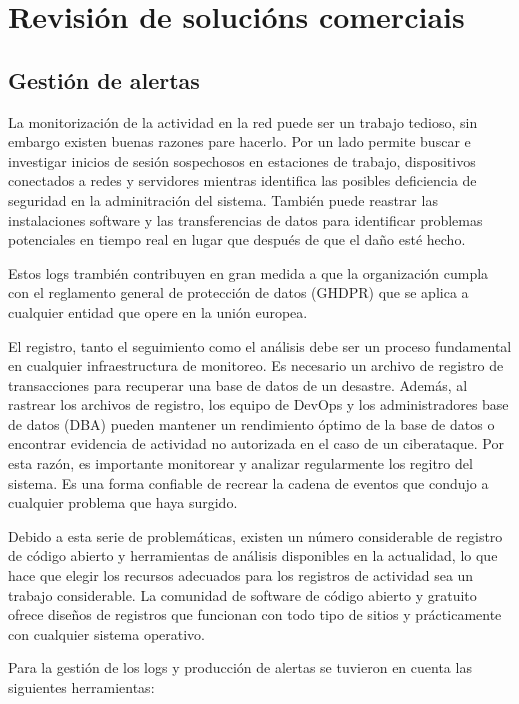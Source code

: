 \chapter{Revisión de solucións comerciais}

\section{Gestión de alertas}

La monitorización de la actividad en la red puede ser un trabajo tedioso, sin embargo existen buenas razones pare hacerlo. Por un lado permite buscar e investigar inicios de sesión sospechosos en estaciones de trabajo, dispositivos conectados a redes y servidores mientras identifica las posibles deficiencia de seguridad en la adminitración del sistema. También puede reastrar las instalaciones software y las transferencias de datos para identificar problemas potenciales en tiempo real en lugar que después de que el daño esté hecho.

Estos logs trambién contribuyen en gran medida a que la organización cumpla con el reglamento general de protección de datos  (GHDPR) que se aplica a cualquier entidad que opere en la unión europea.

El registro, tanto el seguimiento como el análisis debe ser un proceso fundamental en cualquier infraestructura de monitoreo. Es necesario un archivo de registro de transacciones para recuperar una base de datos de un desastre. Además, al rastrear los archivos de registro, los equipo de DevOps y los administradores base de datos (DBA) pueden mantener un rendimiento óptimo de la base de datos o encontrar evidencia de actividad no autorizada en el caso de un ciberataque. Por esta razón, es importante monitorear y analizar regularmente los regitro del sistema. Es una forma confiable de recrear la cadena de eventos que condujo a cualquier problema que haya surgido.

Debido a esta serie de problemáticas, existen un número considerable de registro de código abierto y herramientas de análisis disponibles en la actualidad, lo que hace que elegir los recursos adecuados para los registros de actividad sea un trabajo considerable. La comunidad de software de código abierto y gratuito ofrece diseños de registros que funcionan con todo tipo de sitios y prácticamente con cualquier sistema operativo. 

Para la gestión de los logs y producción de alertas se tuvieron en cuenta las siguientes herramientas:

